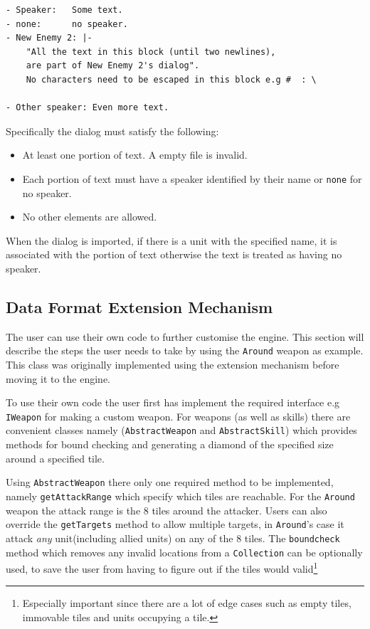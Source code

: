 \begin{lstlisting}[caption=A example showing the features of the dialog's data format]
- Speaker:   Some text.
- none:      no speaker.
- New Enemy 2: |-
    "All the text in this block (until two newlines),
    are part of New Enemy 2's dialog". 
    No characters need to be escaped in this block e.g #  : \

- Other speaker: Even more text.
\end{lstlisting}
Specifically the dialog must satisfy the following:
\begin{itemize}
	\item  At least one portion of text. A empty file is invalid.
	\item  Each portion of text must have a speaker identified by their name or \texttt{none} for no speaker.
	\item  No other elements are allowed.
\end{itemize}

When the dialog is imported, if there is a unit with  the specified name, it is associated with the  portion of text otherwise the text is treated as having no speaker.


\subsection{Data Format Extension Mechanism}
\label{sub:data_format_extension_mechanism}

The user can use their own code to further customise the engine. This section will describe the steps the user needs to take by using the \texttt{Around} weapon as example. This class was originally implemented using the extension mechanism before moving it to the engine. 

To use their own code the user first has implement the required interface e.g \texttt{IWeapon} for making a custom weapon.  For weapons (as well as skills) there are convenient classes namely (\texttt{AbstractWeapon} and \texttt{AbstractSkill}) which provides methods for bound checking and generating a diamond of the specified size around a specified tile. 

Using \texttt{AbstractWeapon} there only one required method to be implemented, namely \texttt{getAttackRange} which specify which tiles are reachable. For the \texttt{Around} weapon the attack range is the 8 tiles around the attacker. Users can also override the \texttt{getTargets} method to allow multiple targets, in \texttt{Around}'s case it attack \emph{any} unit(including allied units) on any of the 8 tiles.  The \texttt{boundcheck} method which removes any invalid locations from a \texttt{Collection} can be optionally used, to save the user from having to figure out if the tiles would valid\footnote{Especially important since there are a lot of edge cases such as empty tiles, immovable tiles and units occupying a tile.}

